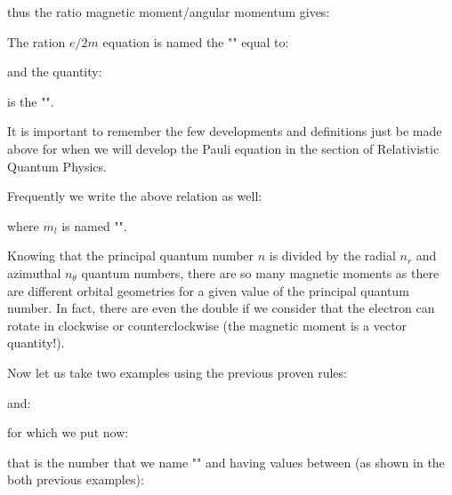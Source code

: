       thus the ratio magnetic moment/angular momentum gives:
      
      The ration $e/2m$ equation is named the "" equal to:
      
     and the quantity:
     
     is the "".
    \begin{tcolorbox}[title=Remark,colframe=black,arc=10pt]
	It is important to remember the few developments and definitions just be made above for when we will develop the Pauli equation in the section of Relativistic Quantum Physics.
	\end{tcolorbox}
	Frequently we write the above relation as well:
    
     where $m_l$ is named "". 
     
     Knowing that the principal quantum number $n$ is divided by the radial $n_r$ and azimuthal $n_\theta$ quantum numbers, there are so many magnetic moments as there are different orbital geometries for a given value of the principal quantum number. In fact, there are even the double if we consider that the electron can rotate in clockwise or counterclockwise (the magnetic moment is a vector quantity!).
     
     Now let us take two examples using the previous proven rules:
    
     and:
     
    for which we put now:
    
     that is the number that we name "" and having values between (as shown in the both previous examples):
     
